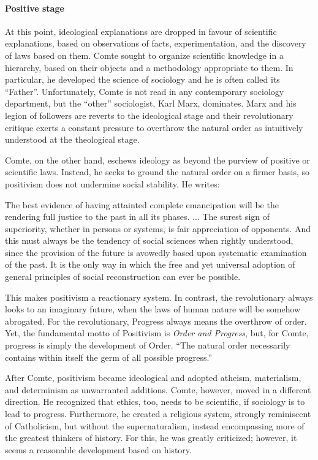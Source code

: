 \paragraph{Positive stage}


At this point, ideological explanations are dropped in favour of scientific explanations, based on observations of facts, experimentation, and the discovery of laws based on them. Comte sought to organize scientific knowledge in a hierarchy, based on their objects and a methodology appropriate to them. In particular, he developed the science of sociology and he is often called its ``Father''. Unfortunately, Comte is not read in any contemporary sociology department, but the ``other'' sociologist, Karl Marx, dominates. Marx and his legion of followers are reverts to the ideological stage and their revolutionary critique exerts a constant pressure to overthrow the natural order as intuitively understood at the theological stage.

Comte, on the other hand, eschews ideology as beyond the purview of positive or scientific laws. Instead, he seeks to ground the natural order on a firmer basis, so positivism does not undermine social stability. He writes:

\begin{quotex}
The best evidence of having attainted complete emancipation will be the rendering full justice to the past in all its phases. ... The surest sign of superiority, whether in persons or systems, is fair appreciation of opponents. And this must always be the tendency of social sciences when rightly understood, since the provision of the future is avowedly based upon systematic examination of the past. It is the only way in which the free and yet universal adoption of general principles of social reconstruction can ever be possible.
\end{quotex}


This makes positivism a reactionary system. In contrast, the revolutionary always looks to an imaginary future, when the laws of human nature will be somehow abrogated. For the revolutionary, Progress always means the overthrow of order. Yet, the fundamental motto of Positivism is \emph{Order and Progress}, but, for Comte, progress is simply the development of Order. ``The natural order necessarily contains within itself the germ of all possible progress.''

After Comte, positivism became ideological and adopted atheism, materialism, and determinism as unwarranted additions. Comte, however, moved in a different direction. He recognized that ethics, too, needs to be scientific, if sociology is to lead to progress. Furthermore, he created a religious system, strongly reminiscent of Catholicism, but without the supernaturalism, instead encompassing more of the greatest thinkers of history. For this, he was greatly criticized; however, it seems a reasonable development based on history.

